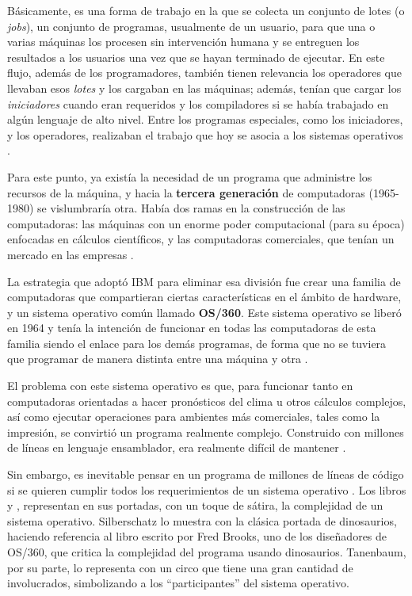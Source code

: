 \documentclass[letterpaper,12pt,oneside]{book}
\begin{document}
        Básicamente, es una forma de trabajo
		en la que se colecta un conjunto de lotes (o \textit{jobs}), un conjunto de programas, usualmente de un usuario, para que una o varias máquinas los procesen sin intervención 
		humana y se entreguen los resultados a los usuarios una vez que se hayan terminado de ejecutar. En este flujo, además de los programadores,
		también tienen relevancia los operadores que llevaban esos \textit{lotes} y los cargaban en las máquinas; además, tenían que cargar los \textit{iniciadores} cuando eran requeridos y los
		compiladores si se había trabajado en algún lenguaje de alto nivel. Entre los programas especiales, como los iniciadores, y los operadores, realizaban
		el trabajo que hoy se asocia a los sistemas operativos \cite{tanenbaum_modern_2002}.
		
		Para este punto, ya existía la necesidad de un programa que administre los recursos de la máquina,  y hacia la \textbf{tercera generación} de computadoras (1965-1980)
		se vislumbraría otra. Había dos ramas en la construcción de las computadoras: las máquinas con un enorme poder computacional (para su época) enfocadas
		en cálculos científicos, y las computadoras comerciales, que tenían un mercado en las empresas \cite{tanenbaum_modern_2002}.
        
        La estrategia que adoptó IBM para eliminar esa división
		fue crear una familia de computadoras que compartieran ciertas características en el ámbito de hardware, y un sistema operativo común llamado
		\textbf{OS/360}. Este sistema operativo se liberó en 1964 y tenía la intención de funcionar en todas las computadoras de esta familia siendo el enlace para los demás programas,
		de forma que no se tuviera que programar de manera distinta entre una máquina y otra \cite{tanenbaum_modern_2002}.
  
        El problema con este sistema operativo es que, para funcionar
		tanto en computadoras orientadas a hacer pronósticos del clima u otros cálculos complejos, así como ejecutar operaciones
		para ambientes más comerciales, tales como la impresión, se convirtió un programa realmente complejo. Construido con millones de líneas en lenguaje ensamblador,
		era realmente difícil de mantener \cite{tanenbaum_modern_2002}.
  
        Sin embargo, es inevitable pensar en un programa
		de millones de líneas de código si se quieren cumplir todos los requerimientos de un sistema operativo 
		. Los libros  \cite{tanenbaum_modern_2002} y \cite{silberschatz_operating_2009}, representan en sus portadas, con un toque de sátira,
		la complejidad de un sistema operativo. Silberschatz lo muestra
		con la clásica portada de dinosaurios, haciendo referencia al libro escrito por Fred Brooks, uno de los diseñadores de OS/360, que critica
        la complejidad del programa usando dinosaurios. Tanenbaum, por su parte, lo representa  con un  circo que
		tiene una gran cantidad de involucrados, simbolizando a los ``participantes'' del sistema operativo.
\end{document}
